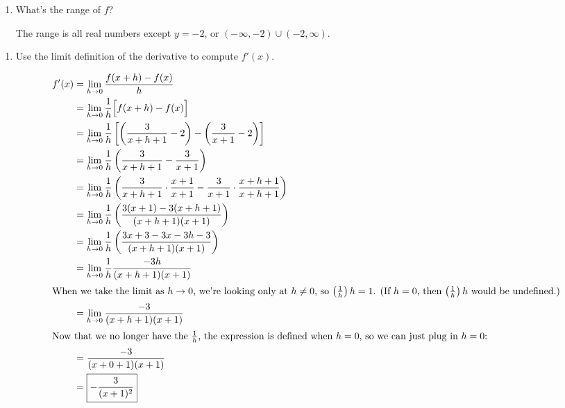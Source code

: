\documentclass{article}
\theoremstyle{theorem}
\begin{document}
\begin{enumerate}
\begin{enumerate}
  \item
    \begin{problem}[\nstretch{0.5}]
      What's the range of $f$?
    \end{problem}

    \begin{solution}
      The range is all real numbers except $y=-2$, or $\boxed{(-\infty, -2)\cup(-2, \infty)}$. 
    \end{solution}

  \end{enumerate}


  \begin{enumerate}[resume]
  \item \label{fall2017-premidterm-5-deriv}
    \begin{problem}[\stretch{4}]
      Use the limit definition of the derivative to compute $f'(x)$.
    \end{problem}

    \begin{solution} 
      \begin{align*}
        f'(x)&=\lim_{h\to 0}\frac{f(x+h)-f(x)}{h}\\
        &= \lim_{h \to 0} \frac{1}{h} \Big[ f(x + h) - f(x) \Big] \\
        &=\lim_{h\to 0} \frac{1}{h} \left[\left(\frac{3}{x+h+1}-2\right)-\left(\frac{3}{x+1}-2\right)\right]\\
        &=\lim_{h\to 0} \frac{1}{h} \left(\frac{3}{x+h+1}-\frac{3}{x+1}\right) \\
        &=\lim_{h\to 0} \frac{1}{h} \left(\frac{3}{x+h+1} \cdot \frac{x + 1}{x + 1} -\frac{3}{x+1} \cdot \frac{x + h + 1}{x + h + 1} \right) \\
        &=\lim_{h\to 0} \frac{1}{h} \left(\frac{3(x+1)-3(x+h+1)}{(x+h+1)(x+1)}\right) \\
        &=\lim_{h\to 0} \frac{1}{h} \left( \frac{3x+3-3x-3h-3}{(x+h+1)(x+1)}\right) \\
        &=\lim_{h\to 0} \frac{1}{h} \frac{-3h}{(x+h+1)(x+1)}\\
        \intertext{When we take the limit as $h \to 0$, we're looking only at $h \neq 0$, so $\left( \frac{1}{h} \right) h = 1$. (If $h = 0$, then $\left( \frac{1}{h} \right) h$ would be undefined.)}%
        &=\lim_{h\to 0}\frac{-3}{(x+h+1)(x+1)} \\
        \intertext{Now that we no longer have the $\frac{1}{h}$, the expression is defined when $h = 0$, so we can just plug in $h = 0$:} %
        &=\frac{-3}{(x+0+1)(x+1)} \\
        &=\boxed{-\frac{3}{(x+1)^2}}
      \end{align*}
    \end{solution}


\end{enumerate}
\end{enumerate}
\end{document}
